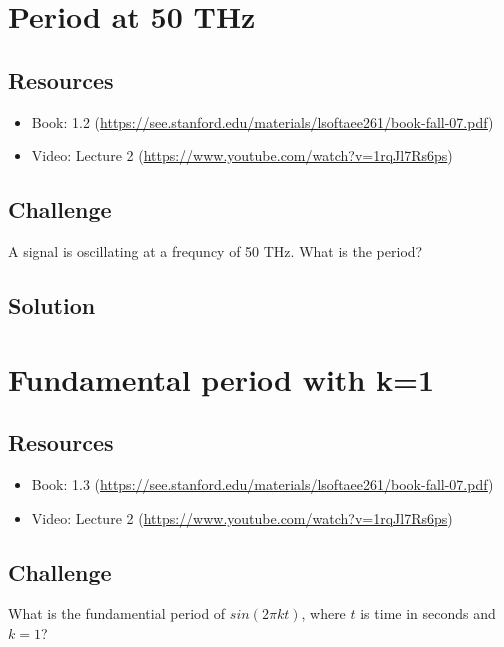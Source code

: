 \section{Period at 50 THz}

\subsection*{Resources}
\begin{itemize}
    \item Book: 1.2 (\url{https://see.stanford.edu/materials/lsoftaee261/book-fall-07.pdf})
    \item Video: Lecture 2 (\url{https://www.youtube.com/watch?v=1rqJl7Rs6ps})
\end{itemize}

\subsection*{Challenge}
A signal is oscillating at a frequncy of 50 THz.  What is the period?

\subsection*{Solution}


\timebox




\newpage

\section {Fundamental period with k=1}

\subsection*{Resources}
\begin{itemize}
    \item Book: 1.3 (\url{https://see.stanford.edu/materials/lsoftaee261/book-fall-07.pdf})
    \item Video: Lecture 2 (\url{https://www.youtube.com/watch?v=1rqJl7Rs6ps})
\end{itemize}

\subsection*{Challenge}
What is the fundamential period of $sin(2 \pi k t)$, where $t$ is time in seconds and $k=1$?

